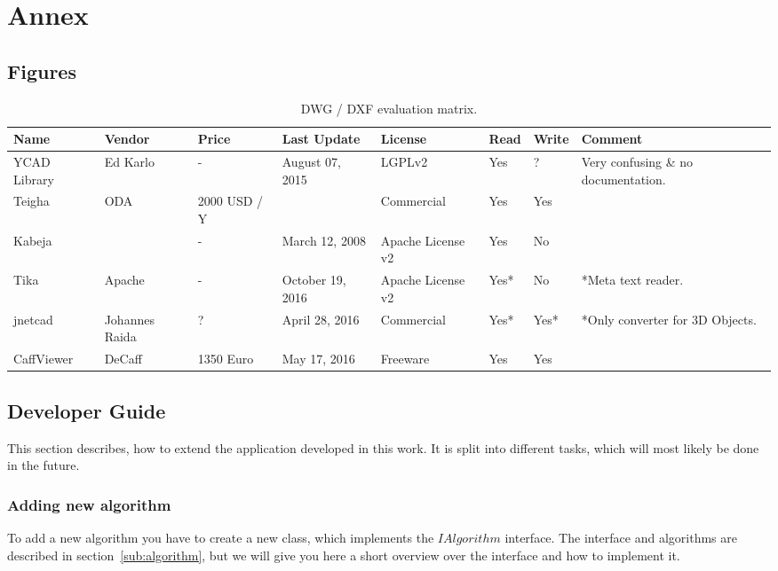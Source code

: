\section{Annex}

\subsection{Figures}
\begin{table}[h]
\centering
\caption{DWG / DXF evaluation matrix.}
\label{tbl:DWGEvaluationMatrix}
\begin{tabular}{@{}llllllll@{}}
\toprule
Name         & Vendor         & Price        & Last Update      & License           & Read & Write & Comment                             \\ \midrule
YCAD Library & Ed Karlo       & -            & August 07, 2015  & LGPLv2            & Yes  & ?     & Very confusing \& no documentation. \\
Teigha       & ODA            & 2000 USD / Y &                  & Commercial        & Yes  & Yes   &                                     \\
Kabeja       &                & -            & March 12, 2008   & Apache License v2 & Yes  & No    &                                     \\
Tika         & Apache         & -            & October 19, 2016 & Apache License v2 & Yes* & No    & *Meta text reader.                  \\
jnetcad      & Johannes Raida & ?            & April 28, 2016   & Commercial        & Yes* & Yes*  & *Only converter for 3D Objects.     \\
CaffViewer   & DeCaff         & 1350 Euro    & May 17, 2016     & Freeware          & Yes  & Yes   &                                     \\ \bottomrule
\end{tabular}
\end{table}

\pagebreak
\subsection{Developer Guide}
This section describes, how to extend the application developed in this work. It is split into different tasks, which will most likely be done in the future.

\subsubsection{Adding new algorithm}
To add a new algorithm you have to create a new class, which implements the $IAlgorithm$ interface. The interface and algorithms are described in section~\ref{sub:algorithm}, but we will give you here a short overview over the interface and how to implement it.

